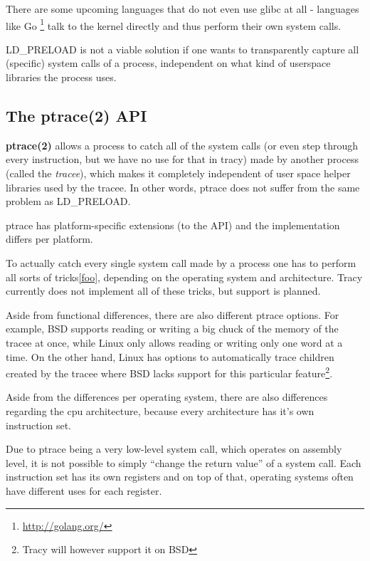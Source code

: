 \documentclass[a4paper, twoside, 10pt, twocolumn]{report}
\begin{document}
There are some upcoming languages that do not even use glibc at all - languages
like Go \footnote{\url{http://golang.org/}} talk to the kernel directly and
thus perform their own system calls.

LD\_PRELOAD is not a viable solution if one wants to transparently capture all
(specific) system calls of a process, independent on what kind of userspace
libraries the process uses.

\subsection{The ptrace(2) API}

\textbf{ptrace(2)} allows a process to catch all of the system calls (or even
step through every instruction, but we have no use for that in tracy)
made by another process (called the \textit{tracee}), which makes it
completely independent of user space helper libraries used by the tracee.
In other words, ptrace does not suffer from the same problem as LD\_PRELOAD.

ptrace has platform-specific extensions (to the API) and the
implementation differs per platform. %

To actually catch every single system call made by a process one has to
perform all sorts of tricks\ref{foo}, depending on the operating system and
architecture. Tracy currently does not implement all of these tricks, but
support is planned.

Aside from functional differences, there are also different ptrace options.
For example, BSD supports reading or writing a big chuck of the memory
of the tracee at once, while Linux only allows reading or writing only one
word at a time. On the other hand, Linux has options to automatically trace
children created by the tracee where BSD lacks support for
this particular feature\footnote{Tracy will however support it on BSD}.

Aside from the differences per operating system, there are also differences
regarding the cpu architecture, because every architecture has it's own
instruction set.

Due to ptrace being a very low-level system call, which operates on assembly
level, it is not possible to simply ``change the return value'' of a system
call. Each instruction set has its own registers and on top of that, operating
systems often have different uses for each register.
\end{document}
